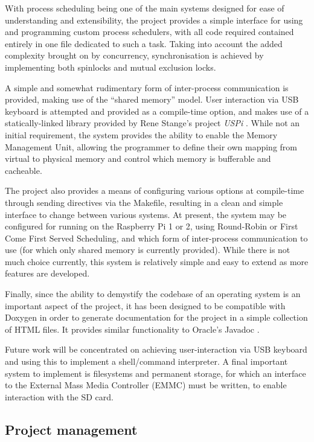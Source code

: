     With process scheduling being one of the main systems designed for ease of
    understanding and extensibility, the project provides a simple interface for
    using and programming custom process schedulers, with all code required
    contained entirely in one file dedicated to such a task.  Taking into
    account the added complexity brought on by concurrency, synchronisation is
    achieved by implementing both spinlocks and mutual exclusion locks.
    
    A simple and somewhat rudimentary form of inter-process communication is
    provided, making use of the ``shared memory'' model. User interaction via
    USB keyboard is attempted and provided as a compile-time option, and makes
    use of a statically-linked library provided by Rene Stange's project
    \textit{USPi} \cite{USPi}. While not an initial requirement, the system
    provides the ability to enable the Memory Management Unit, allowing the
    programmer to define their own mapping from virtual to physical memory and
    control which memory is bufferable and cacheable.

    The project also provides a means of configuring various options at
    compile-time through sending directives via the Makefile, resulting in a
    clean and simple interface to change between various systems. At present,
    the system may be configured for running on the Raspberry Pi 1 or 2, using
    Round-Robin or First Come First Served Scheduling, and which form of
    inter-process communication to use (for which only shared memory is
    currently provided). While there is not much choice currently, this system
    is relatively simple and easy to extend as more features are developed.

    Finally, since the ability to demystify the codebase of an operating system
    is an important aspect of the project, it has been designed to be compatible
    with Doxygen \cite{Doxygen} in order to generate documentation for the
    project in a simple collection of HTML files. It provides similar
    functionality to Oracle's Javadoc \cite{Javadoc}.

    Future work will be concentrated on achieving user-interaction via USB
    keyboard and using this to implement a shell/command interpreter. A final
    important system to implement is filesystems and permanent storage, for
    which an interface to the External Mass Media Controller (EMMC) must be
    written, to enable interaction with the SD card.

\subsection{Project management}
